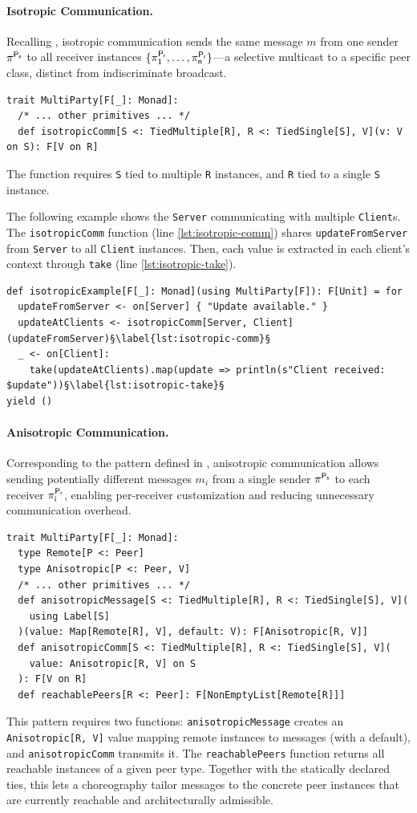 \documentclass[runningheads]{llncs}
\newcommand{\code}[1]{\lstinline[style=scala3,basicstyle=\ttfamily\small\color{vscLightText}]{#1}}
\newcommand{\diff}[1]{{#1}}
\begin{document}
\paragraph{Isotropic Communication.}
Recalling ,
isotropic communication sends the same message $m$ from one sender $\mathsf{\pi_{}^{P_s}}$ to all receiver instances $\{\mathsf{\pi_{1}^{P_r}}, \ldots, \mathsf{\pi_{n}^{P_r}}\}$---a
selective multicast to a specific peer class, distinct from indiscriminate broadcast.
\begin{lstlisting}[style=scala3]
trait MultiParty[F[_]: Monad]:
  /* ... other primitives ... */
  def isotropicComm[S <: TiedMultiple[R], R <: TiedSingle[S], V](v: V on S): F[V on R]
\end{lstlisting}
The function requires \code{S} tied to multiple \code{R} instances,
and \code{R} tied to a single \code{S} instance.

The following example shows the \code{Server} communicating with multiple \code{Client}s.
%
The \code{isotropicComm} function (line \ref{lst:isotropic-comm}) shares \code{updateFromServer} from \code{Server} to all \code{Client} instances.
%
Then,
each value is extracted in each client's context through \code{take} (line \ref{lst:isotropic-take}).
\begin{lstlisting}[style=scala3,escapechar=§]
def isotropicExample[F[_]: Monad](using MultiParty[F]): F[Unit] = for
  updateFromServer <- on[Server] { "Update available." }
  updateAtClients <- isotropicComm[Server, Client](updateFromServer)§\label{lst:isotropic-comm}§
  _ <- on[Client]:
    take(updateAtClients).map(update => println(s"Client received: $update"))§\label{lst:isotropic-take}§
yield ()
\end{lstlisting}

\paragraph{Anisotropic Communication.}
Corresponding to the pattern defined in ,
anisotropic communication allows sending potentially different messages $m_i$ from a single sender $\mathsf{\pi_{}^{P_s}}$ to each receiver $\mathsf{\pi_{i}^{P_r}}$,
enabling per-receiver customization and reducing unnecessary communication overhead.
\begin{lstlisting}[style=scala3]
trait MultiParty[F[_]: Monad]:
  type Remote[P <: Peer]
  type Anisotropic[P <: Peer, V]
  /* ... other primitives ... */
  def anisotropicMessage[S <: TiedMultiple[R], R <: TiedSingle[S], V](
    using Label[S]
  )(value: Map[Remote[R], V], default: V): F[Anisotropic[R, V]]
  def anisotropicComm[S <: TiedMultiple[R], R <: TiedSingle[S], V](
    value: Anisotropic[R, V] on S
  ): F[V on R]
  def reachablePeers[R <: Peer]: F[NonEmptyList[Remote[R]]]
\end{lstlisting}
This pattern requires two functions:
\code{anisotropicMessage} creates an \code{Anisotropic[R, V]} value mapping remote instances to messages (with a default),
and \code{anisotropicComm} transmits it.
The \code{reachablePeers} function returns all reachable instances of a given peer type.
\diff{Together with the statically declared ties, this lets a choreography tailor messages to the concrete peer instances that are currently reachable and architecturally admissible.}
\end{document}
